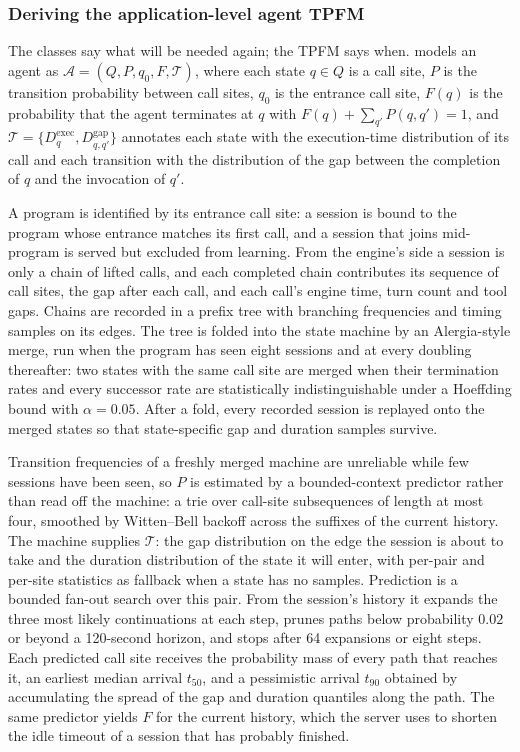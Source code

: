 \subsubsection{Deriving the application-level agent TPFM}
\label{sec:tpfm}

The classes say what will be needed again; the TPFM says when. \sysname models an agent as $\mathcal{A} = (Q, P, q_0, F, \mathcal{T})$, where each state $q \in Q$ is a call site, $P$ is the transition probability between call sites, $q_0$ is the entrance call site, $F(q)$ is the probability that the agent terminates at $q$ with $F(q) + \sum_{q'} P(q, q') = 1$, and $\mathcal{T} = \{D^{\mathrm{exec}}_q, D^{\mathrm{gap}}_{q,q'}\}$ annotates each state with the execution-time distribution of its call and each transition with the distribution of the gap between the completion of $q$ and the invocation of $q'$.

A program is identified by its entrance call site: a session is bound to the program whose entrance matches its first call, and a session that joins mid-program is served but excluded from learning. From the engine's side a session is only a chain of lifted calls, and each completed chain contributes its sequence of call sites, the gap after each call, and each call's engine time, turn count and tool gaps. Chains are recorded in a prefix tree with branching frequencies and timing samples on its edges. The tree is folded into the state machine by an Alergia-style merge, run when the program has seen eight sessions and at every doubling thereafter: two states with the same call site are merged when their termination rates and every successor rate are statistically indistinguishable under a Hoeffding bound with $\alpha = 0.05$. After a fold, every recorded session is replayed onto the merged states so that state-specific gap and duration samples survive.

Transition frequencies of a freshly merged machine are unreliable while few sessions have been seen, so $P$ is estimated by a bounded-context predictor rather than read off the machine: a trie over call-site subsequences of length at most four, smoothed by Witten--Bell backoff across the suffixes of the current history. The machine supplies $\mathcal{T}$: the gap distribution on the edge the session is about to take and the duration distribution of the state it will enter, with per-pair and per-site statistics as fallback when a state has no samples. Prediction is a bounded fan-out search over this pair. From the session's history it expands the three most likely continuations at each step, prunes paths below probability $0.02$ or beyond a 120-second horizon, and stops after 64 expansions or eight steps. Each predicted call site receives the probability mass of every path that reaches it, an earliest median arrival $t_{50}$, and a pessimistic arrival $t_{90}$ obtained by accumulating the spread of the gap and duration quantiles along the path. The same predictor yields $F$ for the current history, which the server uses to shorten the idle timeout of a session that has probably finished.


